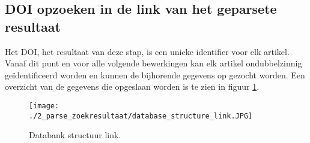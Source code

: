 \subsection{DOI opzoeken in de link van het geparsete resultaat}
Het DOI, het resultaat van deze stap, is een unieke identifier voor elk artikel. Vanaf dit punt en voor alle volgende bewerkingen kan elk artikel ondubbelzinnig geïdentificeerd worden en kunnen de bijhorende gegevens op gezocht worden. Een overzicht van de gegevens die opgeslaan worden is te zien in figuur \ref{fig:databank_structuur_link}.
\begin{figure}
    \centering
    \texttt{[image: ./2\_parse\_zoekresultaat/database\_structure\_link.JPG]}
    \caption[Databank structuur link.]{\label{fig:databank_structuur_link}Databank structuur link.}
\end{figure}
